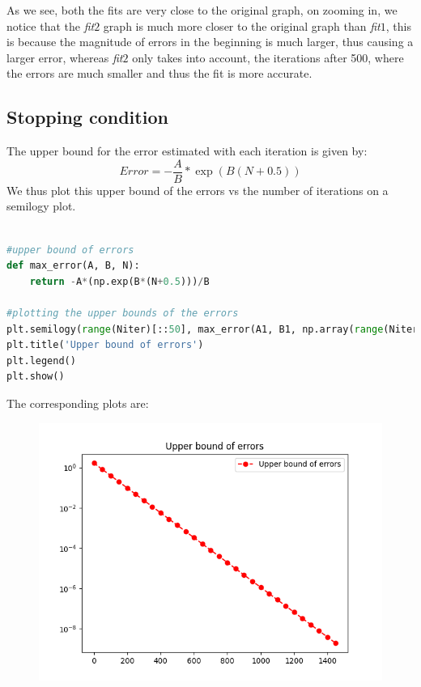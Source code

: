 \documentclass[11pt, a4paper]{article}
\begin{document}
As we see, both the fits are very close to the original graph, on zooming in, we notice that the \textit{fit$2$} graph is much more closer to the original graph than \textit{fit$1$}, this is because the magnitude of errors in the beginning is much larger, thus causing a larger error, whereas \textit{fit$2$} only takes into account, the iterations after 500, where the errors are much smaller and thus the fit is more accurate. 


\subsection{Stopping condition}
The upper bound for the error estimated with each iteration is given by:
\[Error = -\frac{A}{B}*\exp(B(N+0.5))\]
We thus plot this upper bound of the errors vs the number of iterations on a semilogy plot.
\\
\begin{lstlisting}[language = Python]

#upper bound of errors
def max_error(A, B, N):
    return -A*(np.exp(B*(N+0.5)))/B

#plotting the upper bounds of the errors
plt.semilogy(range(Niter)[::50], max_error(A1, B1, np.array(range(Niter)[::50])), 'ro--', label = 'Upper bound of errors')
plt.title('Upper bound of errors')
plt.legend()
plt.show()

\end{lstlisting}

The corresponding plots are:

\begin{figure}[H]
     \centering
     \includegraphics[scale=0.8]{Figure_6.png}
\end{figure}
\end{document}
